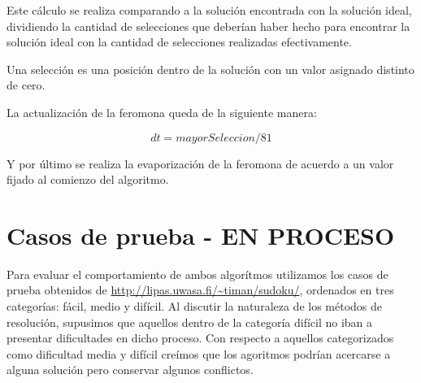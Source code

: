 \documentclass[a4paper,spanish]{article}
\begin{document}
Este cálculo se realiza comparando a la solución encontrada con la solución ideal, dividiendo la cantidad de selecciones que deberían 
haber hecho para encontrar la solución ideal con la cantidad de selecciones realizadas efectivamente.

Una selección es una posición dentro de la solución con un valor asignado distinto de cero.

La actualización de la feromona queda de la siguiente manera:

\begin{equation}
	dt=mayorSeleccion/81
\end{equation}

Y por último se realiza la evaporización de la feromona de acuerdo a un valor fijado al comienzo del algoritmo.



\clearpage

\section{Casos de prueba - EN PROCESO}

Para evaluar el comportamiento de ambos algorítmos utilizamos los casos de prueba obtenidos de \url{http://lipas.uwasa.fi/~timan/sudoku/}, ordenados en tres categorías: fácil, medio y difícil.
Al discutir la naturaleza de los métodos de resolución, supusimos que aquellos dentro de la categoría difícil no iban a presentar dificultades en dicho proceso. Con respecto a aquellos categorizados como dificultad media y difícil creímos que los agoritmos podrían acercarse a alguna solución pero conservar algunos conflictos.
 
\end{document}

